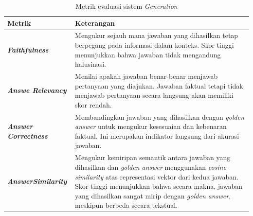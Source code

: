 \begin{table}[h]
	\centering
	\caption{Metrik evaluasi sistem \textit{Generation} }
	\label{tab:generation-evaluation-metrics}
	\begin{tabular}{|p{}|p{}|}
		\hline
		\textbf{Metrik}                               & \textbf{Keterangan}                                                                               \\
		\hline
		\textbf{\textit{Faithfulness}}                &
		Mengukur sejauh mana jawaban yang dihasilkan tetap berpegang pada informasi dalam konteks.
		Skor tinggi menunjukkan bahwa jawaban tidak mengandung halusinasi.                                                                                \\
		\hline
		\textbf{\textit{Answe \newline Relevancy}}    &
		Menilai apakah jawaban benar-benar menjawab pertanyaan yang diajukan.
		Jawaban faktual tetapi tidak menjawab pertanyaan secara langsung akan memiliki skor rendah.                                                       \\
		\hline
		\textbf{\textit{Answer \newline Correctness}} &
		Membandingkan jawaban yang dihasilkan dengan \textit{golden answer} untuk mengukur kesesuaian dan kebenaran faktual.
		Ini merupakan indikator langsung dari akurasi jawaban.                                                                                            \\
		\hline
		\textbf{\textit{Answer\newline Similarity}}   &
		Mengukur kemiripan semantik antara jawaban yang dihasilkan dan \textit{golden answer} menggunakan \textit{cosine similarity} atas representasi vektor dari kedua jawaban.
		Skor tinggi menunjukkan bahwa secara makna, jawaban yang dihasilkan sangat mirip dengan \textit{golden answer}, meskipun berbeda secara tekstual. \\
		\hline
	\end{tabular}
\end{table}